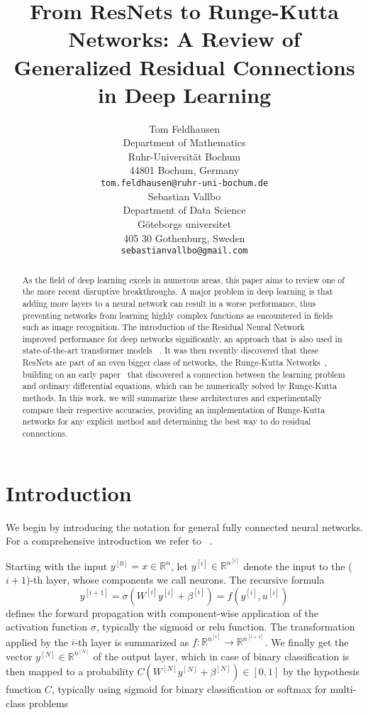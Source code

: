 \documentclass{article}
\title{From ResNets to Runge-Kutta Networks: A Review of Generalized Residual Connections in Deep Learning}
\author{
  Tom Feldhausen \\
  Department of Mathematics\\
  Ruhr-Universität Bochum\\
  44801 Bochum, Germany\\
  \texttt{tom.feldhausen@ruhr-uni-bochum.de} \\
   \And
   Sebastian Vallbo \\
   Department of Data Science\\
   Göteborgs universitet\\
   405 30 Gothenburg, Sweden\\
   \texttt{sebastianvallbo@gmail.com}\\
}
\begin{document}


\maketitle

\begin{abstract}
	As the field of deep learning excels in numerous areas, this paper aims to review one of the more recent disruptive breakthroughs. A major problem in deep learning is that adding more layers to a neural network can result in a worse performance, thus preventing networks from learning highly complex functions as encountered in fields such as image recognition. The introduction of the Residual Neural Network ~\citep{he2016} improved performance for deep networks significantly, an approach that is also used in state-of-the-art transformer models ~\citep{vaswani2017attention}. It was then recently discovered that these ResNets are part of an even bigger class of networks, the Runge-Kutta Networks~\citep{benning2019}, building on an early paper~\citep{leCun1988} that discovered a connection between the learning problem and ordinary differential equations, which can be numerically solved by Runge-Kutta methods. In this work, we will summarize these architectures and experimentally compare their respective accuracies, providing an implementation of Runge-Kutta networks for any explicit method and determining the best way to do residual connections.
\end{abstract}

\section{Introduction}
We begin by introducing the notation for general fully connected neural networks. For a comprehensive introduction we refer to ~\citep{higham2019}.

Starting with the input $y^{[0]} = x \in \mathbb{R}^{n}$, let $y^{[i]} \in \mathbb{R}^{n^{[i]}}$ denote the input to the ($i+1$)-th layer, whose components we call neurons. The recursive formula 
$$
y^{[i+1]} = \sigma(W^{[i]} y^{[i]} + \beta^{[i]}) = f(y^{[i]}, u^{[i]})
$$
defines the forward propagation with component-wise application of the activation function $\sigma$, typically the sigmoid or relu function. The transformation applied by the $i$-th layer is summarized as $f: \mathbb{R}^{n^{[i]}} \to \mathbb{R}^{n^{[i+1]}}$. We finally get the vector $y^{[N]} \in \mathbb{R}^{n^{[N]}}$ of the output layer, which in case of binary classification is then mapped to a probability $C(W^{[N]} y^{[N]} + \beta^{[N]}) \in [0, 1]$ by the hypothesis function $C$, typically using sigmoid for binary classification or softmax for multi-class problems
\end{document}
